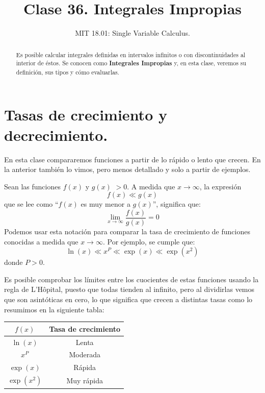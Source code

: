 \documentclass[12pt]{article}
\title{Clase 36. Integrales Impropias}
\author{MIT 18.01: Single Variable Calculus.}
\date{}
\begin{document}
\maketitle

\begin{abstract}
\noindent Es posible calcular integrales definidas en intervalos infinitos o con discontinuidades al interior de éstos. Se conocen como \textbf{Integrales Impropias} y, en esta clase, veremos su definición, sus tipos y cómo evaluarlas.
\end{abstract}


\section{Tasas de crecimiento y decrecimiento.}

En esta clase compararemos funciones a partir de lo rápido o lento que crecen. En la anterior también lo vimos, pero menos detallado y solo a partir de ejemplos.

Sean las funciones $f(x)$ y $g(x)$ $> 0$. A medida que $x \to \infty$, la expresión
\[
  f(x) \ll g(x)
\]
que se lee como ``$f(x)$ es muy menor a $g(x)$'', significa que:
\[
  \lim_{x \to \infty} \frac{f(x)}{g(x)} = 0
\]
Podemos usar esta notación para comparar la tasa de crecimiento de funciones conocidas a medida que $x \to \infty$. Por ejemplo, se cumple que:
\[
  \ln(x) \ll x^{P} \ll \exp(x) \ll \exp(x^{2})
\]
donde $P > 0$.

Es posible comprobar los límites entre los cuocientes de estas funciones usando la regla de L'Hôpital, puesto que todas tienden al infinito, pero al dividirlas vemos que son asintóticas en cero, lo que significa que crecen a distintas tasas como lo resumimos en la siguiente tabla:

\newpage

\begin{table}[hbt!]
\centering

\begin{tabular}{c c}
\hline
\hline
$f(x)$ & Tasa de crecimiento \\
\hline
\hline
$\ln(x)$ & Lenta \\
$x^{P}$ & Moderada \\
$\exp(x)$ & Rápida \\
$\exp(x^{2})$ & Muy rápida \\
\hline
\end{tabular}

\end{table}
\end{document}
